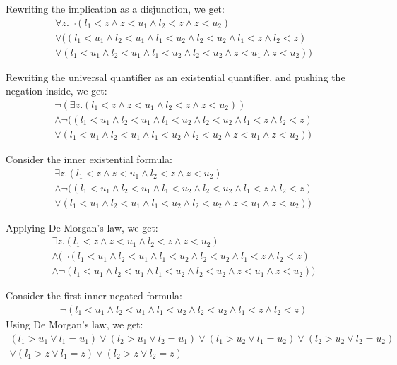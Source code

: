 \documentclass[12pt,letterpaper, onecolumn]{exam}
\begin{document}
\begin{questions}
	Rewriting the implication as a disjunction, we get:
	\begin{align*}
		\forall z. \neg ( l_1 < z \land z < u_1 \land l_2 < z \land z < u_2 ) \\
		\lor ((l_1 < u_1 \land l_2 < u_1 \land l_1 < u_2 \land l_2 < u_2 \land l_1 < z \land l_2 < z) \\
		\lor (l_1 < u_1 \land l_2 < u_1 \land l_1 < u_2 \land l_2 < u_2 \land z < u_1 \land z < u_2))
	\end{align*}

	Rewriting the universal quantifier as an existential quantifier, and pushing the negation inside, we get:
	\begin{align*}
		\neg ( \exists z. ( l_1 < z \land z < u_1 \land l_2 < z \land z < u_2 ) ) \\
		\land \neg ((l_1 < u_1 \land l_2 < u_1 \land l_1 < u_2 \land l_2 < u_2 \land l_1 < z \land l_2 < z) \\
		\lor (l_1 < u_1 \land l_2 < u_1 \land l_1 < u_2 \land l_2 < u_2 \land z < u_1 \land z < u_2))
	\end{align*}

	Consider the inner existential formula:
	\begin{align*}
		\exists z. ( l_1 < z \land z < u_1 \land l_2 < z \land z < u_2 ) \\
		\land \neg ((l_1 < u_1 \land l_2 < u_1 \land l_1 < u_2 \land l_2 < u_2 \land l_1 < z \land l_2 < z) \\
		\lor (l_1 < u_1 \land l_2 < u_1 \land l_1 < u_2 \land l_2 < u_2 \land z < u_1 \land z < u_2))
	\end{align*}

	Applying De Morgan's law, we get:
	\begin{align*}
		\exists z. ( l_1 < z \land z < u_1 \land l_2 < z \land z < u_2 ) \\
		\land (\neg (l_1 < u_1 \land l_2 < u_1 \land l_1 < u_2 \land l_2 < u_2 \land l_1 < z \land l_2 < z) \\
		\land \neg (l_1 < u_1 \land l_2 < u_1 \land l_1 < u_2 \land l_2 < u_2 \land z < u_1 \land z < u_2))
	\end{align*}

	Consider the first inner negated formula:
	\begin{align*}
		\neg (l_1 < u_1 \land l_2 < u_1 \land l_1 < u_2 \land l_2 < u_2 \land l_1 < z \land l_2 < z)
	\end{align*}
	Using De Morgan's law, we get:
	\begin{align*}
		(l_1 > u_1 \lor l_1 = u_1) \lor (l_2 > u_1 \lor l_2 = u_1) \lor (l_1 > u_2 \lor l_1 = u_2) \lor (l_2 > u_2 \lor l_2 = u_2) \\
		\lor (l_1 > z \lor l_1 = z) \lor (l_2 > z \lor l_2 = z)
	\end{align*}


\end{questions}
\end{document}
